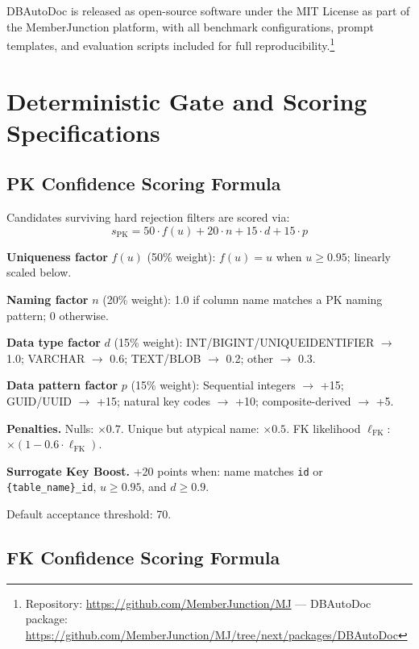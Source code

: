 \documentclass[twocolumn]{svjour3}
\begin{document}
DBAutoDoc is released as open-source software under the MIT License as part of the MemberJunction platform, with all benchmark configurations, prompt templates, and evaluation scripts included for full reproducibility.\footnote{Repository: \url{https://github.com/MemberJunction/MJ} --- DBAutoDoc package: \url{https://github.com/MemberJunction/MJ/tree/next/packages/DBAutoDoc}}


\appendix

\section{Deterministic Gate and Scoring Specifications}\label{app:scoring}

\subsection{PK Confidence Scoring Formula}

Candidates surviving hard rejection filters are scored via:
\begin{equation}
s_{\mathrm{PK}} = 50 \cdot f(u) + 20 \cdot n + 15 \cdot d + 15 \cdot p
\end{equation}

\textbf{Uniqueness factor} $f(u)$ (50\% weight): $f(u) = u$ when $u \geq 0.95$; linearly scaled below.

\textbf{Naming factor} $n$ (20\% weight): 1.0 if column name matches a PK naming pattern; 0 otherwise.

\textbf{Data type factor} $d$ (15\% weight): INT/BIGINT/UNIQUEIDENTIFIER $\to$ 1.0; VARCHAR $\to$ 0.6; TEXT/BLOB $\to$ 0.2; other $\to$ 0.3.

\textbf{Data pattern factor} $p$ (15\% weight): Sequential integers $\to$ +15; GUID/UUID $\to$ +15; natural key codes $\to$ +10; composite-derived $\to$ +5.

\textbf{Penalties.} Nulls: $\times 0.7$. Unique but atypical name: $\times 0.5$. FK likelihood $\ell_{\mathrm{FK}}$: $\times (1 - 0.6 \cdot \ell_{\mathrm{FK}})$.

\textbf{Surrogate Key Boost.} +20 points when: name matches \texttt{id} or \texttt{\{table\_name\}\_id}, $u \geq 0.95$, and $d \geq 0.9$.

Default acceptance threshold: 70.

\subsection{FK Confidence Scoring Formula}
\end{document}

